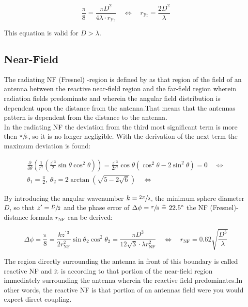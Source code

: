 \begin{equation}
\frac{\pi}{8} = \frac{\pi D^2}{4\lambda\cdot r_{\text{Fr}}} \quad \Leftrightarrow \quad r_{\text{Fr}} = \frac{2D^2}{\lambda}
\end{equation}

This equation is valid for $D > \lambda$. \cite{balanis}

\subsection{Near-Field}

The radiating \ac{NF} (Fresnel) -region is defined by \cite{balanis} as \glqq that region of the field of an antenna between the reactive near-field region and the far-field region wherein radiation fields predominate and wherein the angular field distribution is dependent upon the distance from the antenna.\grqq{ }That means that the antennas pattern is dependent from the distance to the antenna.\\
In the radiating \ac{NF} the deviation from the third most significant term is more then $\sfrac{\pi}{8}$, so it is no longer negligible. With the derivation of the next term the maximum deviation is found:

\begin{align}
\frac{\partial}{\partial\theta}\left(\frac{1}{r^2}\left(\frac{z^{\prime\, 3}}{2}\sin\theta\cos^2\theta\right)\right) = \frac{z^{\prime\, 3}}{2r^2}\cos\theta\left(\cos^2\theta-2\sin^2\theta\right) = 0 \quad \Leftrightarrow\\ 
\theta_1 = \frac{\pi}{2},\ \theta_2=2\arctan\left(\sqrt{5-2\sqrt{6}}\right) \quad \Leftrightarrow
\end{align}

By introducing the angular wavenumber $k=\sfrac{2\pi}{\lambda}$, the minimum sphere diameter $D$, so that $z'=\sfrac{D}{2}$ and the phase error of $\Delta\phi = \sfrac{\pi}{8} \ \widehat{=}\  22.5^\circ$ the \ac{NF} (Fresnel)-distance-formula $r_{\text{NF}}$ can be derived:

\begin{equation}
\Delta\phi = \frac{\pi}{8} = \frac{kz^{\prime\, 3}}{2r_{\text{NF}}^2}\sin\theta_2\cos^2\theta_2= \frac{\pi D^3}{12\sqrt{3}\cdot\lambda r_{\text{NF}}^2} \quad \Leftrightarrow \quad r_{\text{NF}}=0.62\sqrt{\frac{D^3}{\lambda}}
\end{equation}

The region directly surrounding the antenna in front of this boundary is called reactive \ac{NF} and it is according to \cite{balanis} \glqq that portion of the near-field region immediately surrounding the antenna wherein the reactive field predominates.\grqq{ }In other words, the reactive \ac{NF} is that portion of an antennas field were you would expect direct coupling.

